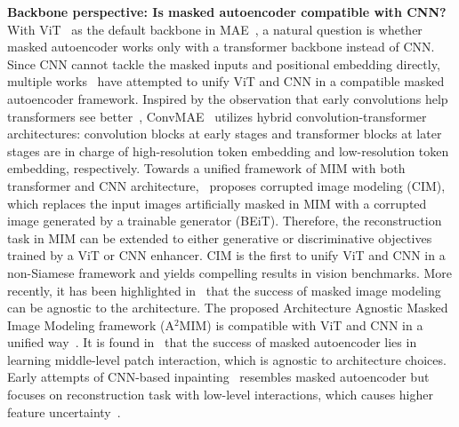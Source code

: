 \documentclass[10pt,journal,compsoc]{IEEEtran}
\begin{document}
\textbf{Backbone perspective: Is masked autoencoder compatible with CNN?} With ViT~\cite{dosovitskiy2021an} as the default backbone in MAE~\cite{he2022masked}, a natural question is whether masked autoencoder works only with a transformer backbone instead of CNN. Since CNN cannot tackle the masked inputs and positional embedding directly, multiple works~\cite{gao2022convmae,fang2022unleashing,li2022architecture,fang2022corrupted} have attempted to unify ViT and CNN in a compatible masked autoencoder framework. Inspired by the observation that early convolutions help transformers see better~\cite{xiao2021early}, ConvMAE~\cite{gao2022convmae} utilizes hybrid convolution-transformer architectures: convolution blocks at early stages and transformer blocks at later stages are in charge of high-resolution token embedding and low-resolution token embedding, respectively. 
Towards a unified framework of MIM with both transformer and CNN architecture,~\cite{fang2022corrupted} proposes corrupted image modeling (CIM), which replaces the input images artificially masked in MIM with a corrupted image generated by a trainable generator (BEiT). Therefore, the reconstruction task in MIM can be extended to either generative or discriminative objectives trained by a ViT or CNN enhancer. CIM is the first to unify ViT and CNN in a non-Siamese framework and yields compelling results in vision benchmarks. More recently, it has been highlighted in~\cite{li2022architecture} that the success of masked image modeling can be agnostic to the architecture. The proposed Architecture Agnostic Masked Image Modeling framework (A$^2$MIM) is compatible with ViT and CNN in a unified way~\cite{li2022architecture}. It is found in~\cite{li2022architecture} that the success of masked autoencoder lies in learning middle-level patch interaction, which is agnostic to architecture choices. Early attempts of CNN-based inpainting~\cite{pathak2016context} resembles masked autoencoder but focuses on reconstruction task with low-level interactions, which causes higher feature uncertainty~\cite{li2022architecture}. 
\end{document}
